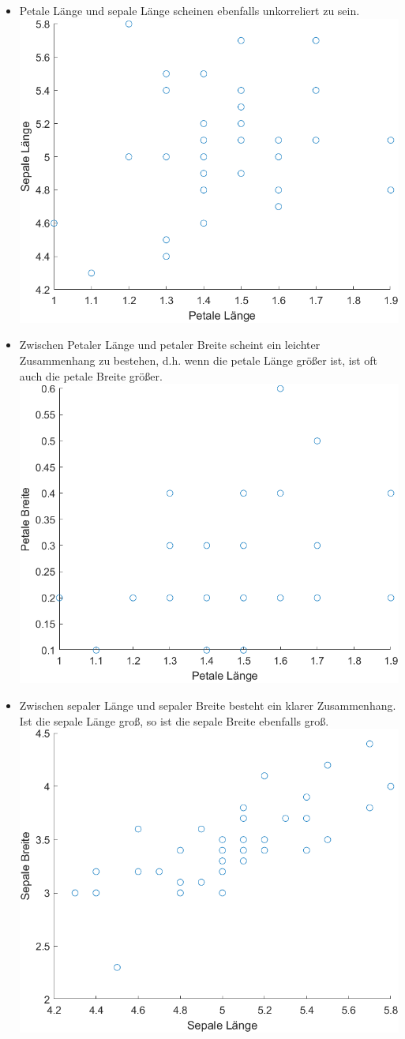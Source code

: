 \documentclass[a4paper]{scrartcl}
\begin{document}
\begin{itemize}
\begin{itemize}
		\item Petale Länge und sepale Länge scheinen ebenfalls unkorreliert zu sein.\\ \includegraphics[width=0.7\linewidth]{assignment2_data/plots/4fii}
		\item Zwischen Petaler Länge und petaler Breite scheint ein leichter Zusammenhang zu bestehen, d.h. wenn die petale Länge größer ist, ist oft auch die petale Breite größer.\\ \includegraphics[width=0.7\linewidth]{assignment2_data/plots/4fiii}
		\item Zwischen sepaler Länge und sepaler Breite besteht ein klarer Zusammenhang. Ist die sepale Länge groß, so ist die sepale Breite ebenfalls groß.\\  \includegraphics[width=0.7\linewidth]{assignment2_data/plots/4fiv}



\end{itemize}
\end{itemize}
\end{document}

